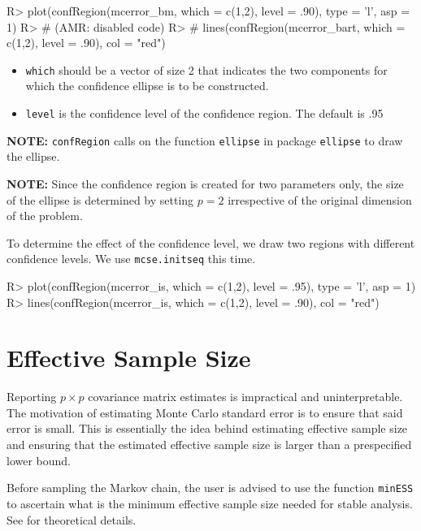 \documentclass[11pt]{article}
\begin{document}
\begin{Schunk}
\begin{Sinput}
R> plot(confRegion(mcerror_bm, which = c(1,2), level = .90), type = 'l', asp = 1)
R> # (AMR: disabled code)
R> # lines(confRegion(mcerror_bart, which = c(1,2), level = .90), col = "red")
\end{Sinput}
\end{Schunk}

\begin{itemize}
\item \texttt{which} should be a vector of size 2 that indicates the two components for which the confidence ellipse is to be constructed.

\item \texttt{level} is the confidence level of the confidence region. The default is .95
\end{itemize}

\bigskip
\textbf{NOTE: } \texttt{confRegion} calls on the function \texttt{ellipse} in package \texttt{ellipse} to draw the ellipse.

\bigskip
\textbf{NOTE: } Since the confidence region is created for two parameters only, the size of the ellipse is determined by setting $p = 2$ irrespective of the original dimension of the problem.

\bigskip
To determine the effect of the confidence level, we draw two regions with different confidence levels. We use \texttt{mcse.initseq} this time.

\begin{Schunk}
\begin{Sinput}
R> plot(confRegion(mcerror_is, which = c(1,2), level = .95), type = 'l', asp = 1)
R> lines(confRegion(mcerror_is, which = c(1,2), level = .90), col = "red")
\end{Sinput}
\end{Schunk}
  
\section{Effective Sample Size}
Reporting $p \times p$ covariance matrix estimates is impractical and uninterpretable. The motivation of estimating Monte Carlo standard error is to ensure that said error is small. This is essentially the idea behind estimating effective sample size and ensuring that the estimated effective sample size is larger than a prespecified lower bound.

Before sampling the Markov chain, the user is advised to use the function \texttt{minESS} to ascertain what is the minimum effective sample size needed for stable analysis. See \cite{vats:fleg:jones:2017b} for theoretical details.
\end{document}

